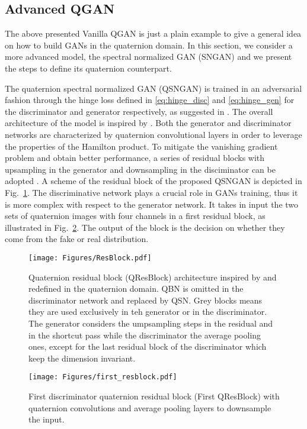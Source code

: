 \documentclass[graybox]{svmult}
\begin{document}
\subsection{Advanced QGAN}
\label{sec:adv_qgan}

The above presented Vanilla QGAN is just a plain example to give a general idea on how to build GANs in the quaternion domain. In this section, we consider a more advanced model, the spectral normalized GAN (SNGAN) \cite{Miyato2018SpectralNF} and we present the steps to define its quaternion counterpart.

The quaternion spectral normalized GAN (QSNGAN) is trained in an adversarial fashion through the hinge loss defined in \eqref{eq:hinge_disc} and \eqref{eq:hinge_gen} for the discriminator and generator respectively, as suggested in \cite{Miyato2018SpectralNF, Chen2019SelfSupervisedGV}. The overall architecture of the model is inspired by \cite{Chen2019SelfSupervisedGV}. Both the generator and discriminator networks are characterized by quaternion convolutional layers in order to leverage the properties of the Hamilton product. To mitigate the vanishing gradient problem and obtain better performance, a series of residual blocks with upsampling in the generator and downsampling in the disciminator can be adopted \cite{Miyato2018SpectralNF}. A scheme of the residual block of the proposed QSNGAN is depicted in Fig.~\ref{fig:resblock}. The discriminative network plays a crucial role in GANs training, thus it is more complex with respect to the generator network. It takes in input the two sets of quaternion images with four channels in a first residual block, as illustrated in Fig.~\ref{fig:1resblock}. The output of the block is the decision on whether they come from the fake or real distribution. 

\begin{figure}[t]
    \centering
    \texttt{[image: Figures/ResBlock.pdf]}
    \caption{Quaternion residual block (QResBlock) architecture inspired by \cite{Miyato2018SpectralNF} and redefined in the quaternion domain. QBN is omitted in the discriminator network and replaced by QSN. Grey blocks means they are used exclusively in teh generator or in the discriminator. The generator considers the umpsampling steps in the residual and in the shortcut pass while the discriminator the average pooling ones, except for the last residual block of the discriminator which keep the dimension invariant.}
    \label{fig:resblock}
\end{figure}
\begin{figure}[t]
    \centering
    \texttt{[image: Figures/first\_resblock.pdf]}
    \caption{First discriminator quaternion residual block (First QResBlock) with quaternion convolutions and average pooling layers to downsample the input.}
    \label{fig:1resblock}
\end{figure}
\end{document}
